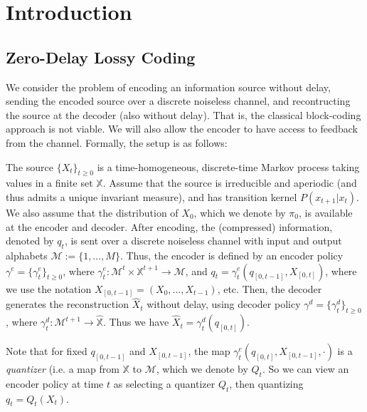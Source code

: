 \documentclass[conference, draftcls, onecolumn]{IEEEtran}
\begin{document}
\section{Introduction}\label{section:introduction}
\subsection{Zero-Delay Lossy Coding}
We consider the problem of encoding an information source without delay, sending the encoded source over a discrete noiseless channel, and recontructing the source at the decoder (also without delay). That is, the classical block-coding approach is not viable. We will also allow the encoder to have access to feedback from the channel. Formally, the setup is as follows:

The source \( \{X_t\}_{t \ge 0} \) is a time-homogeneous, discrete-time Markov process taking values in a finite set \(\mathbb{X}\). Assume that the source is irreducible and aperiodic (and thus admits a unique invariant measure), and has transition kernel \( P(x_{t+1} | x_t) \). We also assume that the distribution of \(X_0\), which we denote by \(\pi_0\), is available at the encoder and decoder. After encoding, the (compressed) information, denoted by \(q_t\), is sent over a discrete noiseless channel with input and output alphabets \( \mathcal{M} := \{1,\ldots,M\} \). Thus, the encoder is defined by an encoder policy \( \gamma^e = \{\gamma^e_t\}_{t \ge 0} \), where \( \gamma^e_t : \mathcal{M}^t \times \mathbb{X}^{t+1} \to \mathcal{M} \), and \(q_t = \gamma^e_t(q_{[0,t-1]},X_{[0,t]})\), where we use the notation \(X_{[0,t-1]} = (X_0, \ldots, X_{t-1})\), etc. Then, the decoder generates the reconstruction \( \hat{X}_t \) without delay, using decoder policy \( \gamma^d = \{\gamma^d_t\}_{t \ge 0} \), where \( \gamma^d_t : \mathcal{M}^{t+1} \to \hat{\mathbb{X}} \). Thus we have \( \hat{X}_t = \gamma^d_t(q_{[0,t]}) \).

Note that for fixed \(q_{[0,t-1]}\) and \(X_{[0,t-1]}\), the map \(\gamma^e_t(q_{[0,t]}, X_{[0,t-1]}, \cdot)\) is a \emph{quantizer} (i.e. a map from \(\mathbb{X}\) to \(\mathcal{M}\), which we denote by \(Q_t\). So we can view an encoder policy at time \(t\) as selecting a quantizer \(Q_t\), then quantizing \(q_t = Q_t(X_t)\).
\end{document}
